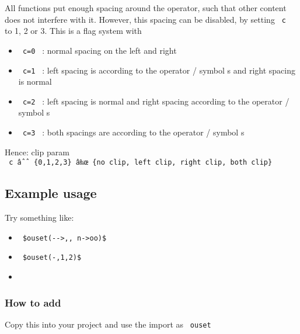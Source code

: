 All functions put enough spacing around the operator, such that other
content does not interfere with it. However, this spacing can be
disabled, by setting \texttt{\ c\ } to 1, 2 or 3. This is a flag system
with

\begin{itemize}
\tightlist
\item
  \texttt{\ c=0\ } : normal spacing on the left and right
\item
  \texttt{\ c=1\ } : left spacing is according to the operator / symbol
  s and right spacing is normal
\item
  \texttt{\ c=2\ } : left spacing is normal and right spacing according
  to the operator / symbol s
\item
  \texttt{\ c=3\ } : both spacings are according to the operator /
  symbol s
\end{itemize}

Hence: clip param
\texttt{\ c\ âˆˆ\ \{0,1,2,3\}\ â‰œ\ \{no\ clip,\ left\ clip,\ right\ clip,\ both\ clip\}\ }

\subsection{Example usage}\label{example-usage}

Try something like:

\begin{itemize}
\item
  \texttt{\ \$ouset(-\/-\textgreater{},,\ n-\textgreater{}oo)\$\ }
\item
  \texttt{\ \$ouset(-,1,2)\$\ }
\item
\begin{Shaded}
\begin{Highlighting}[]

\end{Highlighting}
\end{Shaded}
\end{itemize}

\subsubsection{How to add}\label{how-to-add}

Copy this into your project and use the import as \texttt{\ ouset\ }

